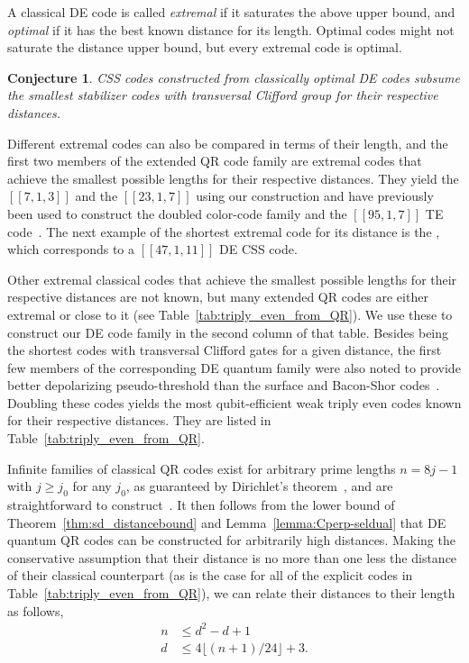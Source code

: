 \documentclass[journal]{IEEEtran}
\newtheorem{conjecture}[theorem]{Conjecture}
\begin{document}
A classical DE code is called \textit{extremal} if it saturates the above upper bound, and \textit{optimal} if it has the best known distance for its length.
Optimal codes might not saturate the distance upper bound, but every extremal code is optimal.

\begin{conjecture}
    CSS codes constructed from classically optimal DE codes subsume the smallest stabilizer codes with transversal Clifford group for their respective distances.
\end{conjecture}

Different extremal codes can also be compared in terms of their length, and
the first two members of the extended QR code family are extremal codes that achieve the smallest possible lengths for their respective distances. 
They yield the $[[7,1,3]]$  and the $[[23,1,7]]$  using our construction and have previously been used to construct the doubled color-code family and the $[[95,1,7]]$ TE code~\cite{bravyi_doubled_2015,sullivan_code_2024}. 
The next example of the shortest extremal code for its distance is the , which corresponds to a $[[47,1,11]]$ DE CSS code. 

Other extremal classical codes that achieve the smallest possible lengths for their respective distances are not known, but many extended QR codes
are either extremal or 
close to it (see Table~\ref{tab:triply_even_from_QR}).
We use these to construct our DE code family in the second column of that table. Besides being the shortest codes with transversal Clifford gates for a given distance, the first few members of the corresponding DE quantum family were also noted to provide better depolarizing pseudo-threshold than the surface and Bacon-Shor codes~\cite{cross_comparative_2009}. 
Doubling these codes yields the most qubit-efficient weak triply even codes known for their respective distances.
They are listed in Table~\ref{tab:triply_even_from_QR}.

Infinite families of classical QR codes exist for arbitrary prime lengths $n=8j-1$ with $j\geq j_0$ for any $j_0$, as guaranteed by Dirichlet's theorem~\cite{apostol_introduction_1976}, and are straightforward to construct~\cite{macwilliams_theory_1977}. It then follows from the lower bound of Theorem~\ref{thm:sd_distancebound} and Lemma~\ref{lemma:Cperp-seldual} that DE quantum QR codes can be constructed for arbitrarily high distances. Making the conservative assumption that their distance is no more than one less  the distance of their classical counterpart (as is the case for all of the explicit codes in Table~\ref{tab:triply_even_from_QR}),
we can relate their distances to their length as follows, 
\begin{align}
   n&\leq d^{2}-d+1\\d&\leq4\lfloor(n+1)/24\rfloor+3.
\end{align} 
\end{document}
